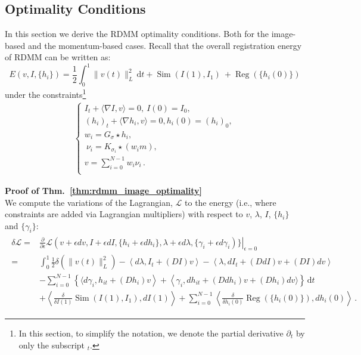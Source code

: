 \documentclass{article}
\numberwithin{equation}{section}
\let\on=\operatorname
\newcommand{\ud}{\,\mathrm{d}}
\begin{document}
\subsection{Optimality Conditions}
\label{sec:optimality_conditions}

In this section we derive the RDMM optimality conditions. Both for the image-based and the momentum-based cases. Recall that the overall registration energy of RDMM can be written as:
\begin{equation}\label{A_reg_energy}
E(v, I,\{h_i\}) =  \frac 12 \int_0^1 \|v(t) \|^2_L \ud t + \on{Sim}(I(1),I_1)\ +\on{Reg}(\{h_i(0)\})
\end{equation}
under the constraints\footnote{In this section, to simplify the notation, we denote the partial derivative $\partial_t$ by only the subscript $_t$.}
\begin{align}\label{A_reg_condition}
\begin{cases}
I_t + \langle \nabla I , v \rangle = 0,~I(0)=I_0,\\
(h_i)_{t} + \langle \nabla h_i , v \rangle = 0,h_i(0)=(h_i)_0,\\
w_i=G_{\sigma}\star h_i,\\\
\nu_i = K_{\sigma_i} \star(w_i m),\\
v = \sum_{i=0}^{N-1} w_i \nu_i \,.\\
\end{cases}
\end{align}

{\bf Proof of Thm.~\eqref{thm:rdmm_image_optimality}}\\
We compute the variations of the Lagrangian, $\mathcal{L}$ to the energy (i.e., where constraints are added via Lagrangian multipliers) with respect to $v$, $\lambda$, $I$, $\{h_i\}$ and $\{\gamma_i\}$:
\begin{align} \label{A3}
\begin{split}
 \delta \mathcal{L} =& \frac{\partial}{\partial \epsilon} \mathcal{L}\left.(v+\epsilon d v, I+\epsilon d I,\{h_i+\epsilon dh_i\}, \lambda+\epsilon d \lambda, \{\gamma_i+\epsilon d \gamma_i)\}\right|_{\epsilon=0} \\
 = &\int_0^1   \frac 12 \delta( \|v(t) \|^2_L)  -\left\langle d\lambda,I_t+ (DI) v\right\rangle
 -\left\langle\lambda, d I_{t}+(D d I) v+(D I) d v\right\rangle\\
 &-\sum_{i=0}^{N-1}\left\{\langle d\gamma_i, h_{it}+ (D h_i) v \right\rangle+ \left\langle\gamma_i, d h_{it}+(D d h_i) v+(D h_i) d v\rangle\right\} \ud t\\
 & +\left\langle\frac{\delta}{\delta I(1)}\on{Sim}(I(1),I_1),dI(1)\right\rangle + \sum_{i=0}^{N-1}\left\langle\frac{\delta}{\delta h_i(0)}\on{Reg}(\{h_i(0)\}),dh_i(0)\right\rangle\,.
 \end{split}
\end{align}
\end{document}
